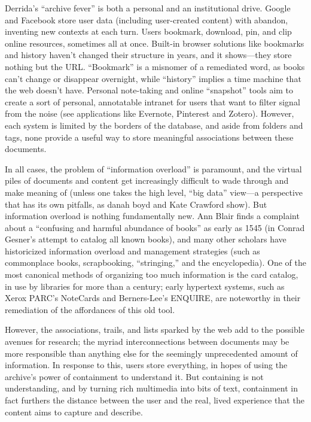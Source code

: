 Derrida's ``archive fever'' is both a personal and an institutional drive. Google and Facebook store user data (including user-created content) with abandon, inventing new contexts at each turn. Users bookmark, download, pin, and clip online resources, sometimes all at once. Built-in browser solutions like bookmarks and history haven't changed their structure in years, and it shows—they store nothing but the URL. ``Bookmark'' is a misnomer of a remediated word, as books can't change or disappear overnight, while ``history'' implies a time machine that the web doesn't have. Personal note-taking and online ``snapshot'' tools aim to create a sort of personal, annotatable intranet for users that want to filter signal from the noise (see applications like Evernote, Pinterest and Zotero). However, each system is limited by the borders of the database, and aside from folders and tags, none provide a useful way to store meaningful associations between these documents.

In all cases, the problem of ``information overload'' is paramount, and the virtual piles of documents and content get increasingly difficult to wade through and make meaning of (unless one takes the high level, ``big data'' view—a perspective that has its own pitfalls, as danah boyd and Kate Crawford show).  But information overload is nothing fundamentally new. Ann Blair finds a complaint about a ``confusing and harmful abundance of books'' as early as 1545 (in Conrad Gesner's attempt to catalog all known books), and many other scholars have historicized information overload and management strategies (such as commonplace books, scrapbooking, ``stringing,'' and the encyclopedia).  One of the most canonical methods of organizing too much information is the card catalog, in use by libraries for more than a century; early hypertext systems, such as Xerox PARC's NoteCards and Berners-Lee's ENQUIRE, are noteworthy in their remediation of the affordances of this old tool.

However, the associations, trails, and lists sparked by the web add to the possible avenues for research; the myriad interconnections between documents may be more responsible than anything else for the seemingly unprecedented amount of information. In response to this, users store everything, in hopes of using the archive's power of containment to understand it. But containing is not understanding, and by turning rich multimedia into bits of text, containment in fact furthers the distance between the user and the real, lived experience that the content aims to capture and describe.


